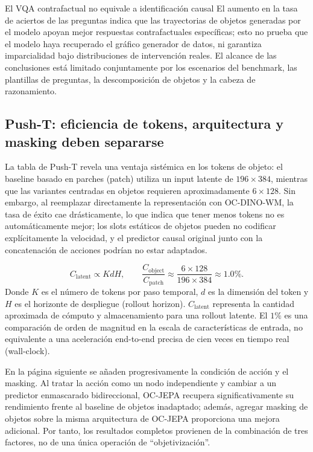 \begin{warningbox}{El VQA contrafactual no equivale a identificación causal}
El aumento en la tasa de aciertos de las preguntas indica que las trayectorias de objetos generadas por el modelo apoyan mejor respuestas contrafactuales específicas; esto no prueba que el modelo haya recuperado el gráfico generador de datos, ni garantiza imparcialidad bajo distribuciones de intervención reales. El alcance de las conclusiones está limitado conjuntamente por los escenarios del benchmark, las plantillas de preguntas, la descomposición de objetos y la cabeza de razonamiento.
\end{warningbox}

\subsection{Push-T: eficiencia de tokens, arquitectura y masking deben separarse}

La tabla de Push-T revela una ventaja sistémica en los tokens de objeto: el baseline basado en parches (patch) utiliza un input latente de $196\times384$, mientras que las variantes centradas en objetos requieren aproximadamente $6\times128$. Sin embargo, al reemplazar directamente la representación con OC-DINO-WM, la tasa de éxito cae drásticamente, lo que indica que tener menos tokens no es automáticamente mejor; los slots estáticos de objetos pueden no codificar explícitamente la velocidad, y el predictor causal original junto con la concatenación de acciones podrían no estar adaptados.


\[
C_{\text{latent}}\propto KdH,
\qquad
\frac{C_{\text{object}}}{C_{\text{patch}}}
\approx\frac{6\times128}{196\times384}\approx1.0\%.
\]
Donde $K$ es el número de tokens por paso temporal, $d$ es la dimensión del token y $H$ es el horizonte de despliegue (rollout horizon). $C_{\text{latent}}$ representa la cantidad aproximada de cómputo y almacenamiento para una rollout latente. El $1\%$ es una comparación de orden de magnitud en la escala de características de entrada, no equivalente a una aceleración end-to-end precisa de cien veces en tiempo real (wall-clock).

En la página siguiente se añaden progresivamente la condición de acción y el masking. Al tratar la acción como un nodo independiente y cambiar a un predictor enmascarado bidireccional, OC-JEPA recupera significativamente su rendimiento frente al baseline de objetos inadaptado; además, agregar masking de objetos sobre la misma arquitectura de OC-JEPA proporciona una mejora adicional. Por tanto, los resultados completos provienen de la combinación de tres factores, no de una única operación de ``objetivización''.

